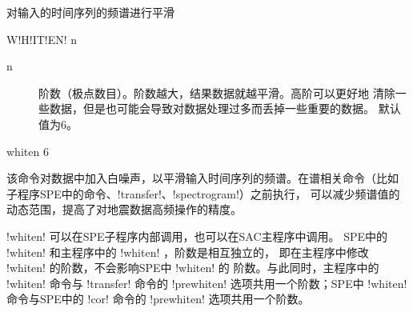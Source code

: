 \label{cmd:whiten}

对输入的时间序列的频谱进行平滑

\begin{SACSTX}
W!H!IT!EN! n
\end{SACSTX}

\begin{description}
\item [n]  阶数（极点数目）。阶数越大，结果数据就越平滑。高阶可以更好地
    清除一些数据，但是也可能会导致对数据处理过多而丢掉一些重要的数据。
    默认值为6。
\end{description}

\begin{SACDFT}
whiten 6
\end{SACDFT}

该命令对数据中加入白噪声，以平滑输入时间序列的频谱。在谱相关命令（比如
子程序SPE中的命令、!transfer!、!spectrogram!）之前执行，
可以减少频谱值的动态范围，提高了对地震数据高频操作的精度。

!whiten! 可以在SPE子程序内部调用，也可以在SAC主程序中调用。
SPE中的 !whiten! 和主程序中的 !whiten! ，阶数是相互独立的，
即在主程序中修改 !whiten! 的阶数，不会影响SPE中 !whiten! 的
阶数。与此同时，主程序中的 !whiten! 命令与 !transfer! 命令的
!prewhiten! 选项共用一个阶数；SPE中 !whiten! 命令与SPE中的
!cor! 命令的 !prewhiten! 选项共用一个阶数。
